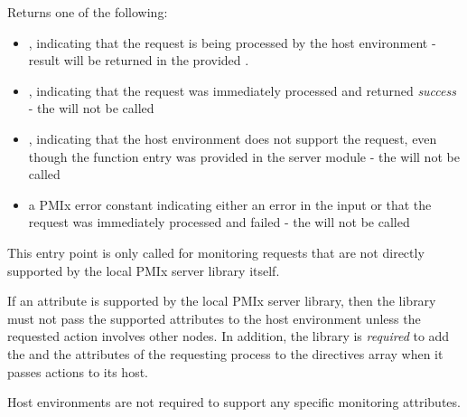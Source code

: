 \begin{arglist}
\end{arglist}

Returns one of the following:

\begin{itemize}
    \item {}, indicating that the request is being processed by the host environment - result will be returned in the provided .
    \item {}, indicating that the request was immediately processed and returned \textit{success} - the  will not be called
    \item {}, indicating that the host environment does not support the request, even though the function entry was provided in the server module - the  will not be called
    \item a PMIx error constant indicating either an error in the input or that the request was immediately processed and failed - the  will not be called
\end{itemize}

This entry point is only called for monitoring requests that are not directly supported by the local \ac{PMIx} server library itself.

\reqattrstart
If an attribute is supported by the local \ac{PMIx} server library, then the library must not pass the supported attributes to the host environment unless the requested action involves other nodes. In addition, the library is \textit{required} to add the  and the  attributes of the requesting process to the directives array when it passes actions to its host.

Host environments are not required to support any specific monitoring attributes.

\reqattrend

